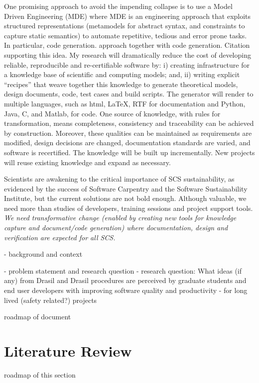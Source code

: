 \documentclass[12pt]{article}
\begin{document}
One promising approach to avoid the impending collapse is to use a Model Driven
Engineering (MDE) where MDE is an engineering approach that exploits structured representations
(metamodels for abstract syntax, and constraints to capture static semantics) to
automate repetitive, tedious and error prone tasks.  In particular, code
generation.   approach together with code generation.  Citation supporting
this idea.  My research will dramatically reduce the cost of developing reliable,
reproducible and re-certifiable software by: i) creating infrastructure for a
knowledge base of scientific and computing models; and, ii) writing explicit
``recipes'' that weave together this knowledge to generate theoretical models,
design documents, code, test cases and build scripts. The generator will render
to multiple languages, such as html, LaTeX, RTF for documentation and Python,
Java, C, and Matlab, for code. One source of knowledge, with rules for
transformation, means completeness, consistency and traceability can be achieved by
construction. Moreover, these qualities can be maintained as requirements are
modified, design decisions are changed, documentation standards are varied, and
software is re­certified.  The knowledge will be built up incrementally.  New
projects will reuse existing knowledge and expand as necessary.

Scientists are awakening to the critical importance of SCS sustainability, as
evidenced by the success of Software Carpentry and the Software
Sustainability Institute, but the current solutions are not bold enough.
Although valuable, we need more than studies of developers, training sessions
and project support tools.  \emph{We need transformative change (enabled by
  creating new tools for knowledge capture and document/code generation) where
  documentation, design and verification are expected for all SCS.}

- background and context

- problem statement and research question
- research question: What ideas (if any) from Drasil and Drasil procedures are perceived
by graduate students and end user developers with improving software quality and
productivity - for long lived (safety related?) projects

roadmap of document

\section{Literature Review}

roadmap of this section
\end{document}
